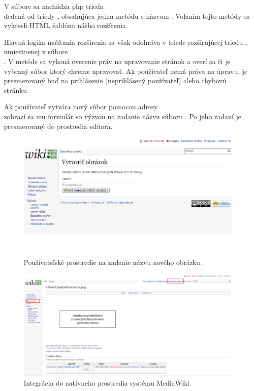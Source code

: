 V súbore  sa nachádza php trieda \\
 dedená od triedy , obsahujúca jednu metódu s názvom . Volaním tejto metódy sa vykreslí HTML šablóna nášho rozšírenia.

Hlavná logika načítania rozšírenia sa však odohráva v triede  rozširujúcej triedu , umiestnenej v súbore \\
. V metóde  sa vykoná overenie práv na upravovanie stránok a overí sa či je vybraný súbor ktorý chceme upravovať. Ak používateľ nemá práva na úpravu, je presmerovaný buď na prihlásenie (neprihlásený používateľ) alebo chybovú stránku.

Ak používateľ vytvára nový súbor pomocou adresy \\
 zobrazí sa mu formulár so výzvou na zadanie názvu súboru . Po jeho zadaní je presmerovaný do prostredia editora.

\begin{figure}[h]
	\centerline{\includegraphics[width=1\textwidth]{images/results/base-new}}
	\caption{Používateľské prostredie na zadanie názvu nového obrázku.}
	\label{obr:base-new}
\end{figure}
\FloatBarrier
\begin{figure}[h]
	\centerline{\includegraphics[width=1\textwidth]{images/results/base-integration}}
	\caption{Integrácia do natívneho prostredia systému MediaWiki}
\label{obr:base-integration}
\end{figure}
\FloatBarrier


